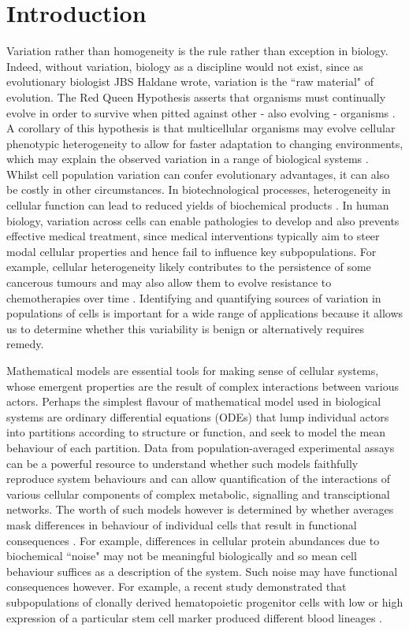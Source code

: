 \documentclass[10pt,letterpaper]{article}
\begin{document}
\section{Introduction}
Variation rather than homogeneity is the rule rather than exception in biology. Indeed, without variation, biology as a discipline would not exist, since as evolutionary biologist JBS Haldane wrote, variation is the ``raw material" of evolution. The Red Queen Hypothesis asserts that organisms must continually evolve in order to survive when pitted against other - also evolving - organisms \cite{ridley1994red}. A corollary of this hypothesis is that multicellular organisms may evolve cellular phenotypic heterogeneity to allow for faster adaptation to changing environments, which may explain the observed variation in a range of biological systems \cite{fraser2009chance}. Whilst cell population variation can confer evolutionary advantages, it can also be costly in other circumstances. In biotechnological processes, heterogeneity in cellular function can lead to reduced yields of biochemical products \cite{delvigne2014metabolic}. In human biology, variation across cells can enable pathologies to develop and also prevents effective medical treatment, since medical interventions typically aim to steer modal cellular properties and hence fail to influence key subpopulations. For example, cellular heterogeneity likely contributes to the persistence of some cancerous tumours \cite{gatenby2007cellular} and may also allow them to evolve resistance to chemotherapies over time \cite{altrock2015mathematics}. Identifying and quantifying sources of variation in populations of cells is important for a wide range of applications because it allows us to determine whether this variability is benign or alternatively requires remedy.

Mathematical models are essential tools for making sense of cellular systems, whose emergent properties are the result of complex interactions between various actors. Perhaps the simplest flavour of mathematical model used in biological systems are ordinary differential equations (ODEs) that lump individual actors into partitions according to structure or function, and seek to model the mean behaviour of each partition. Data from population-averaged experimental assays can be a powerful resource to understand whether such models faithfully reproduce system behaviours and can allow quantification of the interactions of various cellular components of complex metabolic, signalling and transciptional networks. The worth of such models however is determined by whether averages mask differences in behaviour of individual cells that result in functional consequences \cite{altschuler2010cellular}. For example, differences in cellular protein abundances due to biochemical ``noise" may not be meaningful biologically \cite{elowitz2002stochastic} and so mean cell behaviour suffices as a description of the system. Such noise may have functional consequences however. For example, a recent study demonstrated that subpopulations of clonally derived hematopoietic progenitor cells with low or high expression of a particular stem cell marker produced different blood lineages \cite{chang2008transcriptome}. 
\end{document}
